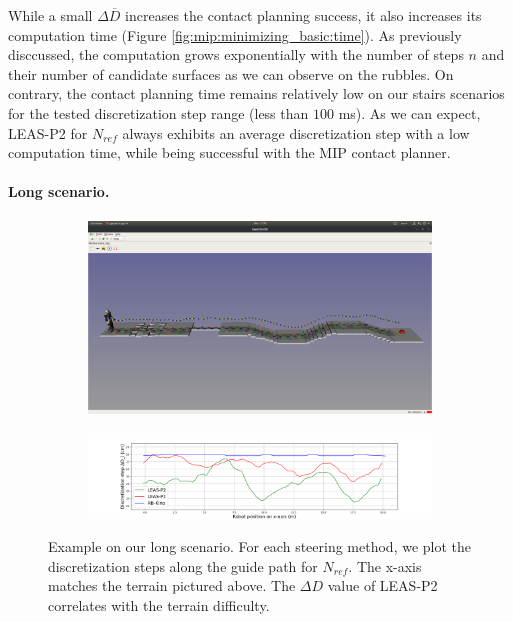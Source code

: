 While a small $\Delta \overline{D}$ increases the contact planning success, it also increases its computation time (Figure \ref{fig:mip:minimizing_basic:time}). As previously disccussed, the computation grows exponentially with the number of steps $n$ and their number of candidate surfaces as we can observe on the rubbles.
On contrary, the contact planning time remains relatively low on our stairs scenarios for the tested discretization step range (less than $100$ ms). 
As we can expect, LEAS-P2 for $N_{ref}$ always exhibits an average discretization step with a low computation time, while being successful with the MIP contact planner.


\paragraph{Long scenario.}
\begin{figure}[ht]
    \captionsetup[subfigure]{justification=centering}
    \centering
    \begin{subfigure}[t]{0.9\linewidth}
        \includegraphics[trim={1cm 12cm 1cm 15cm}, clip,width=\textwidth]{Figures/Chapter_MIP_SL1M/1x11_guide_all_surf_steps.png}
    \end{subfigure}
    \begin{subfigure}[t]{0.9\linewidth}
        \includegraphics[trim={4cm 0cm 3.5cm 1.5cm}, clip,width=\textwidth]{Figures/Chapter_MIP_SL1M/res_mip/long_discr_x.png}
    \end{subfigure}
    \caption{Example on our long scenario. For each steering method, we plot the discretization steps along the guide path for $N_{ref}$. The x-axis matches the terrain pictured above. The $\Delta D$ value of LEAS-P2 correlates with the terrain difficulty.}
    \label{fig:mip:long_range}
\end{figure}

